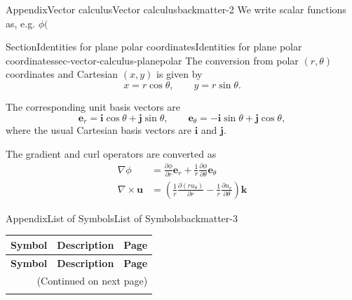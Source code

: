 \documentclass[oneside,10pt,]{book}
\numberwithin{equation}{section}
\newcommand{\pd}[2]{\frac{\partial#1}{\partial#2}}
\newcommand{\be}{\boldsymbol{e}}
\newcommand{\bu}{\boldsymbol{u}}
\newcommand{\bi}{\boldsymbol{i}}
\newcommand{\bj}{\boldsymbol{j}}
\newcommand{\bk}{\boldsymbol{k}}
\newcommand{\amp}{&}
\begin{document}
\begin{appendixptx}{Appendix}{Vector calculus}{}{Vector calculus}{}{}{backmatter-2}
\renewcommand*{\appendixname}{Appendix}
We write scalar functions as, e.g. \(\phi(\)%
%
%
\typeout{************************************************}
\typeout{************************************************}
%
\begin{sectionptx}{Section}{Identities for plane polar coordinates}{}{Identities for plane polar coordinates}{}{}{sec-vector-calculus-planepolar}
The conversion from polar \((r, \theta)\) coordinates and Cartesian \((x, y)\) is given by%
\begin{equation}
x = r\cos\theta, \qquad y = r\sin\theta. \label{eqn-appendix-polarxy}
\end{equation}
%
\par
The corresponding unit basis vectors are%
\begin{equation}
\be_r = \bi \cos\theta + \bj \sin\theta, \qquad \be_{\theta} = -\bi \sin\theta + \bj \cos\theta,  \label{eqn-appendix-polar-er-etheta}
\end{equation}
where the usual Cartesian basis vectors are \(\bi\) and \(\bj\).%
\par
The gradient and curl operators are converted as%
\begin{align}
\nabla \phi \amp= \pd{\phi}{r}\be_r + \frac{1}{r} \pd{\phi}{\theta}\be_{\theta} \label{eqn-identity-grad-polar}\\
\nabla \times \bu \amp= \left(\frac{1}{r} \pd{(ru_\theta)}{r} - \frac{1}{r} \pd{u_r}{\theta}\right) \bk \label{eqn-identity-curlpolar}
\end{align}
%
\end{sectionptx}
\end{appendixptx}
%
%
\typeout{************************************************}
\typeout{************************************************}
%
\begin{appendixptx}{Appendix}{List of Symbols}{}{List of Symbols}{}{}{backmatter-3}
\renewcommand*{\appendixname}{Appendix}
\begin{longtable}[l]{lp{}r}
\addtocounter{table}{-1}
\textbf{Symbol}&\textbf{Description}&\textbf{Page}\\[1em]
\endfirsthead
\textbf{Symbol}&\textbf{Description}&\textbf{Page}\\[1em]
\endhead
\multicolumn{3}{r}{(Continued on next page)}\\
\endfoot
\endlastfoot
\end{longtable}
\end{appendixptx}
\end{document}
